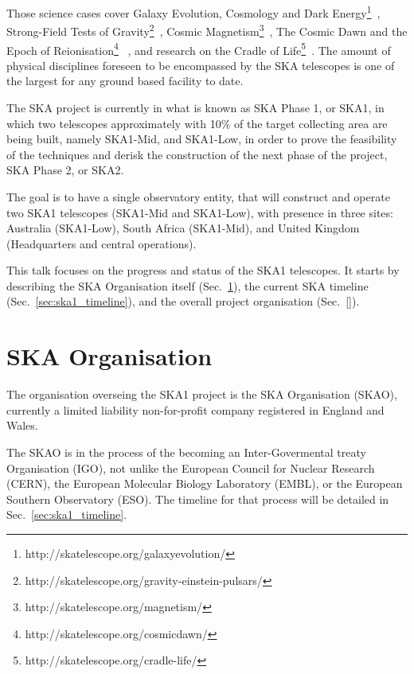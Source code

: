 \documentclass[a4paper,
               biblatex,       %
               keeplastbox,    %
               ]{jacow-2_1}    %
\begin{document}
Those science cases cover Galaxy Evolution, Cosmology and Dark Energy\footnote{http://skatelescope.org/galaxyevolution/}~\cite{2015aska.confE..67P, 2015aska.confE..16M, 2015aska.confE..51F}, Strong-Field Tests of Gravity\footnote{http://skatelescope.org/gravity-einstein-pulsars/}~\cite{2015aska.confE..36K}, Cosmic Magnetism\footnote{http://skatelescope.org/magnetism/}~\cite{2015aska.confE..92J}, The Cosmic Dawn and the Epoch of Reionisation\footnote{http://skatelescope.org/cosmicdawn/} ~\cite{2015aska.confE...1K}, and research on the Cradle of Life\footnote{http://skatelescope.org/cradle-life/}~\cite{2015aska.confE.115H}. The amount of physical disciplines foreseen to be encompassed by the SKA telescopes is one of the largest for any ground based facility to date.

The SKA project is currently in what is known as SKA Phase 1, or SKA1, in which two telescopes approximately with 10\% of the target collecting area are being built, namely SKA1-Mid, and SKA1-Low, in order to prove the feasibility of the techniques and derisk the construction of the next phase of the project, SKA Phase 2, or SKA2.

The goal is to have a single observatory entity, that will construct and operate two SKA1 telescopes (SKA1-Mid and SKA1-Low), with presence in three sites: Australia (SKA1-Low), South Africa (SKA1-Mid), and United Kingdom (Headquarters and central operations).

This talk focuses on the progress and status of the SKA1 telescopes. It starts by describing the SKA Organisation itself (Sec.~\ref{sec:ska_organisation}), the current SKA timeline (Sec.~\ref{sec:ska1_timeline}), and the overall project organisation (Sec.~\ref{}). 


\section{SKA Organisation} %
\label{sec:ska_organisation}
The organisation overseing the SKA1 project is the SKA Organisation (SKAO), currently a limited liability non-for-profit company registered in England and Wales.

The SKAO is in the process of the becoming an Inter-Govermental treaty Organisation (IGO), not unlike the European Council for Nuclear Research (CERN), the European Molecular Biology Laboratory (EMBL), or the European Southern Observatory (ESO). The timeline for that process will be detailed in Sec.~\ref{sec:ska1_timeline}.
\end{document}
